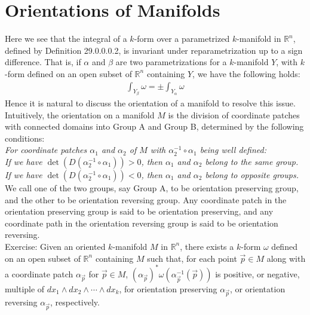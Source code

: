 \documentclass[15pt]{book}
\theoremstyle{break}
\theoremstyle{break}
\newcommand{\R}{\mathbb{R}}
\newcommand{\exercise}{\color{green}Exercise: \color{black}}
\begin{document}
\section[Orientations of Manifolds]{\color{red} Orientations of Manifolds\color{black}}
Here we see that the integral of a $k$-form over a parametrized $k$-manifold in $\R^n$, defined by Definition 29.0.0.0.2, is invariant under reparametrization up to a sign difference. That is, if $\alpha$ and $\beta$ are two parametrizations for a $k$-manifold $Y$, with $k$-form defined on an open subset of $\R^n$ containing $Y$, we have the following holds:
\begin{align*}
\int_{Y_\beta} \omega = \pm \int_{Y_\alpha} \omega
\end{align*}
Hence it is natural to discuss the orientation of a manifold to resolve this issue. Intuitively, the orientation on a manifold $M$ is the division of coordinate patches with connected domains into Group A and Group B, determined by the following conditions:\\

\textit{For coordinate patches $\alpha_1$ and $\alpha_2$ of $M$ with $\alpha_2^{-1} \circ \alpha_1$ being well defined: \\
If we have $\det(D(\alpha_2^{-1} \circ \alpha_1))>0$, then $\alpha_1$ and $\alpha_2$ belong to the same group. \\
If we have $\det(D(\alpha_2^{-1} \circ \alpha_1))<0$, then $\alpha_1$ and $\alpha_2$ belong to opposite groups. }\\

We call one of the two groups, say Group A, to be orientation preserving group, and the other to be orientation reversing group. Any coordinate patch in the orientation preserving group is said to be orientation preserving, and any coordinate path in the orientation reversing group is said to be orientation reversing. \\

\exercise Given an oriented $k$-manifold $M $ in $\R^n$, there exists a $k$-form $\omega$ defined on an open subset of $\R^n$ containing $M$ such that, for each point $\vec{p}\in M$ along with a coordinate patch $\alpha_{\vec{p}}$ for $\vec{p}\in M$, $(\alpha_{\vec{p}})^*\omega(\alpha_{\vec{p}}^{-1}(\vec{p}))$ is positive, or negative, multiple of $dx_1\wedge dx_2 \wedge \cdots \wedge dx_k$, for orientation preserving $\alpha_{\vec{p}}$, or orientation reversing $\alpha_{\vec{p}}$, respectively.\\
\end{document}
